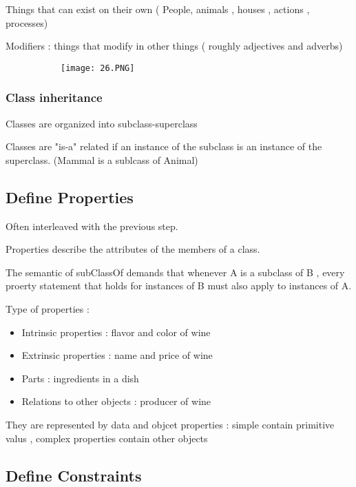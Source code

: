 \documentclass{article}
\begin{document}
Things that can exist on their own ( People, animals , houses , actions , processes)

Modifiers : things that modify in other things ( roughly adjectives and adverbs)

\begin{figure}[ht!]
  \centering
  \begin{subfigure}[b]{0.7\linewidth}
    \texttt{[image: 26.PNG]}
  \end{subfigure}
\end{figure}

\subsubsection{Class inheritance}

Classes are organized into subclass-superclass

Classes are "is-a" related if an instance of the subclass is an instance of the superclass. (Mammal is a sublcass of Animal)

\subsection{Define Properties}

Often interleaved with the previous step.

Properties describe the attributes of the members of a class.

The semantic of subClassOf demands that whenever A is a subclass of B , every proerty statement that holds for instances of B must also apply to instances of A.

Type of properties : 
\begin{itemize}
    \item Intrinsic properties : flavor and color of wine
    \item Extrinsic properties : name and price of wine
    \item Parts : ingredients in a dish
    \item Relations to other objects : producer of wine
\end{itemize}

They are represented by data and objcet properties : simple contain primitive valus , complex properties contain other objects

\subsection{Define Constraints}
\end{document}
